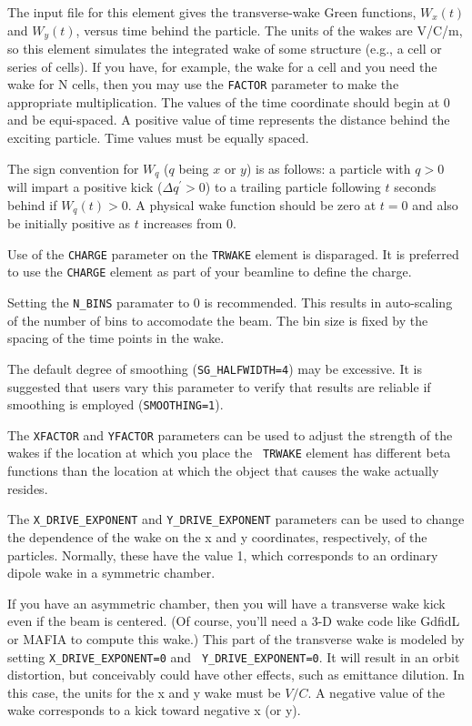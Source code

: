 The input file for this element gives the transverse-wake Green
functions, $W_x(t)$ and $W_y(t)$, versus time behind the particle. The
units of the wakes are V/C/m, so this element simulates the integrated
wake of some structure (e.g., a cell or series of cells).  If you
have, for example, the wake for a cell and you need the wake for N
cells, then you may use the {\tt FACTOR} parameter to make the
appropriate multiplication.  The values of the time coordinate should
begin at 0 and be equi-spaced.  A positive value of time represents
the distance behind the exciting particle.   Time values must be equally
spaced.

The sign convention for $W_q$ ($q$ being $x$ or $y$) is as follows: a
particle with $q>0$ will impart a positive kick ($\Delta q^\prime >
0$) to a trailing particle following $t$ seconds behind if $W_q(t)>0$.
A physical wake function should be zero at $t=0$ and also be initially
positive as $t$ increases from 0.

Use of the {\tt CHARGE} parameter on the {\tt TRWAKE} element is
disparaged.  It is preferred to use the {\tt CHARGE} element as part
of your beamline to define the charge.  

Setting the {\tt N\_BINS} paramater to 0 is recommended.  This results
in auto-scaling of the number of bins to accomodate the beam.  The bin
size is fixed by the spacing of the time points in the wake.

The default degree of smoothing ({\tt SG\_HALFWIDTH=4}) may be excessive.
It is suggested that users vary this parameter to verify that results
are reliable if smoothing is employed ({\tt SMOOTHING=1}).

The {\tt XFACTOR} and {\tt YFACTOR} parameters can be used to adjust
the strength of the wakes if the location at which you place the {\tt
TRWAKE} element has different beta functions than the location at
which the object that causes the wake actually resides.  

The {\tt X\_DRIVE\_EXPONENT} and {\tt Y\_DRIVE\_EXPONENT} parameters can be used to change the
dependence of the wake on the x and y coordinates, respectively, of the particles.  
Normally, these have the value 1, which corresponds to 
an ordinary dipole wake in a symmetric chamber.  

If you have an asymmetric chamber, then you will have a transverse
wake kick even if the beam is centered.  (Of course, you'll need a 3-D
wake code like GdfidL or MAFIA to compute this wake.)  This part of
the transverse wake is modeled by setting {\tt X\_DRIVE\_EXPONENT=0} and {\tt
Y\_DRIVE\_EXPONENT=0}.  It will result in an orbit distortion, but conceivably
could have other effects, such as emittance dilution.  In this case, 
the units for the x and y wake must be $V/C$.  A negative value of the wake
corresponds to a kick toward negative x (or y).

